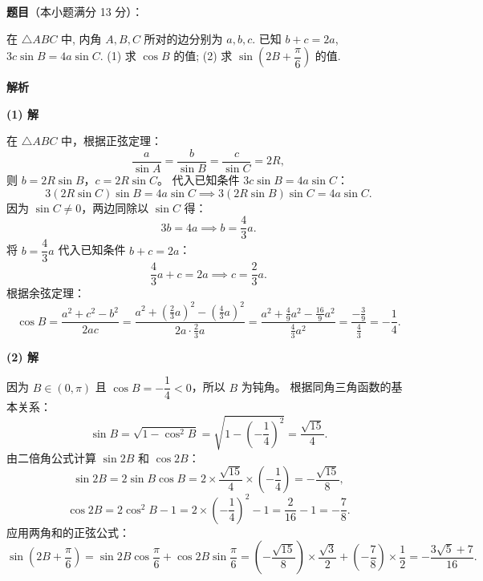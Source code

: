 \begin{answer}

\textbf{题目}（本小题满分 13 分）：

在 $\triangle ABC$ 中, 内角 $A, B, C$ 所对的边分别为 $a, b, c$. 已知 $b + c = 2a$, $3c \sin B = 4a \sin C$.
(1) 求 $\cos B$ 的值;
(2) 求 $\sin\left(2B + \dfrac{\pi}{6}\right)$ 的值.

\textbf{解析}

\textbf{(1) 解}

在 $\triangle ABC$ 中，根据正弦定理：
\nopagebreak[4]
\[\frac{a}{\sin A} = \frac{b}{\sin B} = \frac{c}{\sin C} = 2R,\]
则 $b = 2R\sin B$，$c = 2R\sin C$。
代入已知条件 $3c \sin B = 4a \sin C$：
\nopagebreak[4]
\[3(2R\sin C)\sin B = 4a\sin C \implies 3(2R\sin B)\sin C = 4a\sin C.\]
因为 $\sin C \neq 0$，两边同除以 $\sin C$ 得：
\nopagebreak[4]
\[3b = 4a \implies b = \frac{4}{3} a.\]
将 $b = \dfrac{4}{3} a$ 代入已知条件 $b + c = 2a$：
\nopagebreak[4]
\[\frac{4}{3} a + c = 2a \implies c = \frac{2}{3} a.\]
根据余弦定理：
\nopagebreak[4]
\[\cos B = \frac{a^2 + c^2 - b^2}{2ac} = \frac{a^2 + \left(\frac{2}{3}a\right)^2 - \left(\frac{4}{3}a\right)^2}{2a \cdot \frac{2}{3}a} = \frac{a^2 + \frac{4}{9}a^2 - \frac{16}{9}a^2}{\frac{4}{3}a^2} = \frac{-\frac{3}{9}}{\frac{4}{3}} = -\frac{1}{4}.\]

\textbf{(2) 解}

因为 $B \in (0, \pi)$ 且 $\cos B = -\dfrac{1}{4} < 0$，所以 $B$ 为钝角。
根据同角三角函数的基本关系：
\nopagebreak[4]
\[\sin B = \sqrt{1 - \cos^2 B} = \sqrt{1 - \left(-\frac{1}{4}\right)^2} = \frac{\sqrt{15}}{4}.\]
由二倍角公式计算 $\sin 2B$ 和 $\cos 2B$：
\nopagebreak[4]
\[\sin 2B = 2\sin B \cos B = 2 \times \frac{\sqrt{15}}{4} \times \left(-\frac{1}{4}\right) = -\frac{\sqrt{15}}{8},\]
\nopagebreak[4]
\[\cos 2B = 2\cos^2 B - 1 = 2 \times \left(-\frac{1}{4}\right)^2 - 1 = \frac{2}{16} - 1 = -\frac{7}{8}.\]
应用两角和的正弦公式：
\nopagebreak[4]
\[\sin\left(2B + \frac{\pi}{6}\right) = \sin 2B \cos\frac{\pi}{6} + \cos 2B \sin\frac{\pi}{6} = \left(-\frac{\sqrt{15}}{8}\right) \times \frac{\sqrt{3}}{2} + \left(-\frac{7}{8}\right) \times \frac{1}{2} = -\frac{3\sqrt{5} + 7}{16}.\]



\end{answer}
